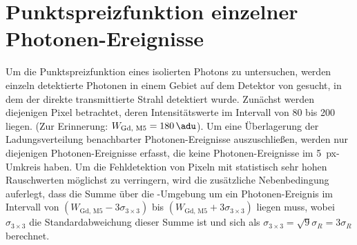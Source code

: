 \section{Punktspreizfunktion einzelner Photonen-Ereignisse}
\label{text:punktspreizfunktion}
Um die Punktspreizfunktion eines isolierten Photons zu untersuchen, werden einzeln detektierte Photonen in einem Gebiet auf dem Detektor von  gesucht, in dem der direkte transmittierte Strahl detektiert wurde. Zunächst werden diejenigen Pixel betrachtet, deren Intensitätswerte im Intervall von \SI{80}{\adu} bis \SI{200}{\adu} liegen. (Zur Erinnerung: $W_{\text{Gd, M5}} = \SI{180}{\adu}$). Um eine Überlagerung der Ladungsverteilung benachbarter Photonen-Ereignisse auszuschließen, werden nur diejenigen Photonen-Ereignisse erfasst, die keine Photonen-Ereignisse im \SI{5}{px}-Umkreis haben. Um die Fehldetektion von Pixeln mit statistisch sehr hohen Rauschwerten möglichst zu verringern, wird die zusätzliche Nebenbedingung auferlegt, dass die Summe über die -Umgebung um ein Photonen-Ereignis im Intervall von $(W_{\text{Gd, M5}}-3\sigma_{3\times 3})$ bis $(W_{\text{Gd, M5}}+3\sigma_{3\times 3})$ liegen muss, wobei $\sigma_{3\times 3}$ die Standardabweichung dieser Summe ist und sich als $\sigma_{3\times 3} = \sqrt{9}\sigma_R = 3 \sigma_R$ berechnet.

